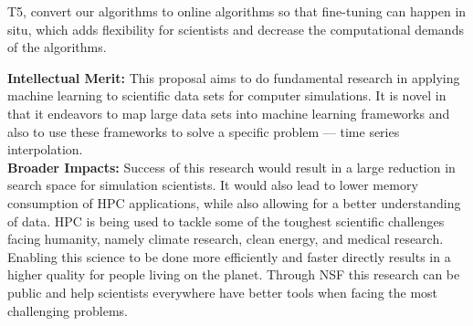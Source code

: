 \documentclass[12pt]{article}
\begin{document}
T5, convert our algorithms to online algorithms so
that fine-tuning can happen in situ, which adds flexibility for scientists
and decrease the computational demands of the algorithms. 


\textbf{Intellectual Merit:} This proposal aims to do fundamental research in
applying machine learning to scientific data sets for computer simulations. It
is novel in that it endeavors to map large data sets 
into machine learning frameworks and also to use these frameworks to solve a
specific problem --- time series interpolation. 
%
\\\textbf{Broader Impacts:} Success of this research would result in a large
reduction in search space for simulation scientists. It would also lead to lower 
memory consumption of HPC applications, while also allowing for a
better understanding of data. HPC is being used to tackle some of the toughest
scientific challenges facing humanity, namely climate research, clean energy,
and medical research. Enabling this science to be done more efficiently and
faster directly results in a higher quality for people living on the planet.
Through NSF this research can be public and help scientists everywhere have
better tools when facing the most challenging problems.


\scriptsize


%
%
\end{document}
